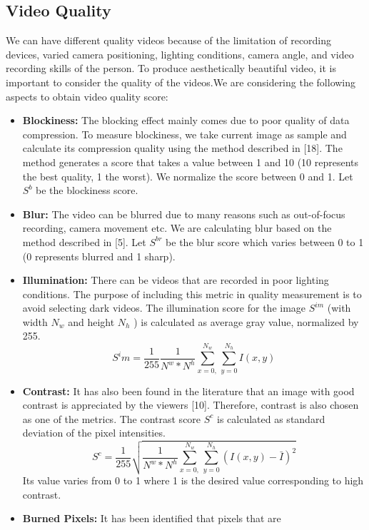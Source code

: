 \documentclass{sig-alternate-05-2015}
\begin{document}
\subsection{Video Quality}
We can have different quality videos because of the limitation of
recording devices, varied camera positioning, lighting conditions,
camera angle, and video recording skills of the person. To produce
aesthetically beautiful video, it is important to consider the quality
of the videos.We are considering the following aspects to obtain
video quality score:
\begin{itemize}
    \item \textbf{Blockiness: } The blocking effect mainly comes due to poor
quality of data compression. To measure blockiness, we take
current image as sample and calculate its compression quality using the method described in [18]. The method generates
a score that takes a value between 1 and 10 (10 represents the
best quality, 1 the worst). We normalize the score between 0
and 1. Let $S^b$ be the blockiness score.
    \item \textbf{Blur: } The video can be blurred due to many reasons such as
out-of-focus recording, camera movement etc. We are calculating blur based on the method described in [5]. Let $S^{br}$
be the blur score which varies between 0 to 1 (0 represents
blurred and 1 sharp).
    \item \textbf{Illumination: } There can be videos that are recorded in poor
lighting conditions. The purpose of including this metric in
quality measurement is to avoid selecting dark videos. The
illumination score for the image $S^{im}$ (with width $N_w$ and
height $N_h$ ) is calculated as average gray value, normalized
by 255.
\begin{equation}
    S^im = \dfrac{1}{255}\dfrac{1}{N^w*N^h}\sum_{x=0,}^{N_w}\sum_{y=0}^{N_h}I(x,y)
\end{equation}
    \item \textbf{Contrast: } It has also been found in the literature that an image with good contrast is appreciated by the viewers [10].
Therefore, contrast is also chosen as one of the metrics. The
contrast score $S^c$ is calculated as standard deviation of the
pixel intensities.
\begin{equation}
    S^c = \dfrac{1}{255}\sqrt{\dfrac{1}{N^w*N^h}\sum_{x=0,}^{N_w}\sum_{y=0}^{N_h}(I(x,y)-\bar{I})^2}
\end{equation}
Its value varies from 0 to 1 where 1 is the desired value corresponding to high contrast.
    \item \textbf{Burned Pixels:} It has been identified that pixels that are

\end{itemize}
\end{document}
